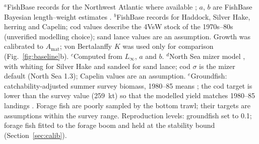 \documentclass[12pt,letterpaper,fleqn]{article}
\begin{document}
\begin{table}[p]
\smallskip
\raggedright\footnotesize
$^{a}$FishBase records for the Northwest Atlantic where available \autocite{froese2026fishbase}; $a$, $b$ are FishBase Bayesian length--weight estimates \autocite{froese2014bayesian}.
$^{b}$FishBase records for Haddock, Silver Hake, herring and Capelin; cod values describe the 4VsW stock of the 1970s--80s (unverified modelling choice); sand lance values are an assumption. Growth was calibrated to $A_{\mathrm{mat}}$; von Bertalanffy $K$ was used only for comparison (Fig.~\ref{fig:baseline}b).
$^{c}$Computed from $L_\infty$, $a$ and $b$.
$^{d}$North Sea mizer model \autocite{blanchard2014evaluating}, with whiting for Silver Hake and sandeel for sand lance; cod $\sigma$ is the mizer default (North Sea 1.3); Capelin values are an assumption.
$^{e}$Groundfish: catchability-adjusted summer survey biomass, 1980--85 means \autocite{adekoya2026code}; the cod target is lower than the survey value (259~kt) so that the modelled yield matches 1980--85 landings \autocite{fanning2003assessment}. Forage fish are poorly sampled by the bottom trawl; their targets are assumptions within the survey range.
Reproduction levels: groundfish set to 0.1; forage fish fitted to the forage boom and held at the stability bound (Section~\ref{sec:calib}).
\end{table}
\end{document}
